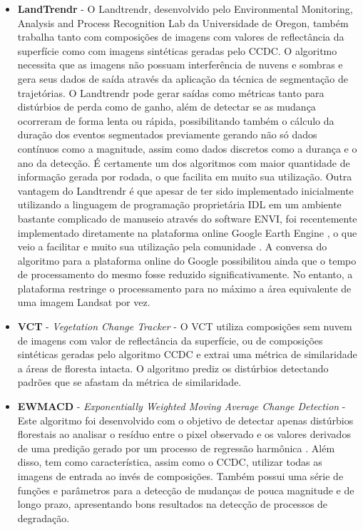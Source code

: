 \documentclass[12pt,a4paper]{article}
\begin{document}
\begin{itemize}
  \item \textbf{LandTrendr} \citep{KENNEDY20102897, KENNEDY2012117} - O Landtrendr, desenvolvido pelo Environmental Monitoring, Analysis and Process Recognition Lab da Universidade de Oregon, também trabalha tanto com composições de imagens com valores de reflectância da superfície como com imagens sintéticas geradas pelo CCDC. O algoritmo necessita que as imagens não possuam interferência de nuvens e sombras e gera seus dados de saída através da aplicação da técnica de segmentação de trajetórias. O Landtrendr pode gerar saídas como métricas tanto para distúrbios de perda como de ganho, além de detectar se as mudança ocorreram de forma lenta ou rápida, possibilitando também o cálculo da duração dos eventos segmentados previamente gerando não só dados contínuos como a magnitude, assim como dados discretos como a durança e o ano da detecção. É certamente um dos algoritmos com maior quantidade de informação gerada por rodada, o que facilita em muito sua utilização. Outra vantagem do Landtrendr é que apesar de ter sido implementado inicialmente utilizando a linguagem de programação proprietária IDL em um ambiente bastante complicado de manuseio através do software ENVI, foi recentemente implementado diretamente na plataforma online Google Earth Engine \citep{GORELICK201718}, o que veio a facilitar e muito sua utilização pela comunidade \citep{Kennedy2018}. A conversa do algoritmo para a plataforma online do Google possibilitou ainda que o tempo de processamento do mesmo fosse reduzido significativamente. No entanto, a plataforma restringe o processamento para no máximo a área equivalente de uma imagem Landsat por vez.
  
  \item \textbf{VCT} - \textit{Vegetation Change Tracker} \citep{Huang2010, THOMAS201119} - O VCT utiliza composições sem nuvem de imagens com valor de reflectância da superfície, ou de composições sintéticas geradas pelo algoritmo CCDC e extrai uma métrica de similaridade a áreas de floresta intacta. O algoritmo prediz os distúrbios detectando padrões que se afastam da métrica de similaridade.
  
  \item \textbf{EWMACD} - \textit{Exponentially Weighted Moving Average Change Detection} \citep{Brooks2014} - Este algoritmo foi desenvolvido com o objetivo de detectar apenas distúrbios florestais ao analisar o resíduo entre o pixel observado e os valores derivados de uma predição gerado por um processo de regressão harmônica \citep{Brooks2012}. Além disso, tem como característica, assim como o CCDC, utilizar todas as imagens de entrada ao invés de composições. Também possui uma série de funções e parâmetros para a detecção de mudanças de pouca magnitude e de longo prazo, apresentando bons resultados na detecção de processos de degradação.
  

\end{itemize}
\end{document}
